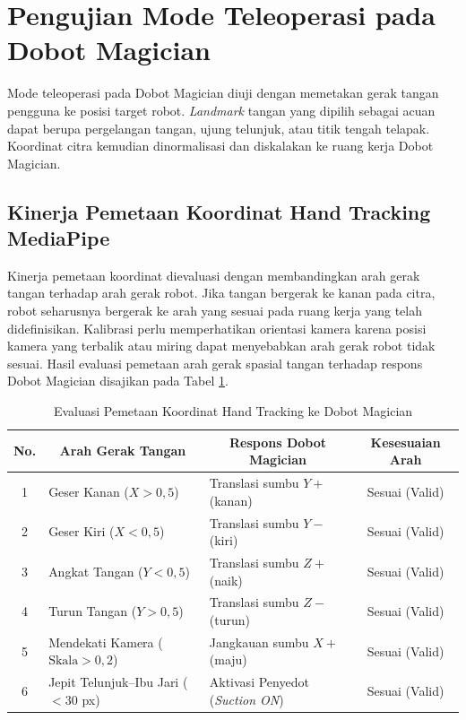 \section{Pengujian Mode Teleoperasi pada Dobot Magician}
Mode teleoperasi pada Dobot Magician diuji dengan memetakan gerak tangan pengguna ke posisi target robot. \textit{Landmark} tangan yang dipilih sebagai acuan dapat berupa pergelangan tangan, ujung telunjuk, atau titik tengah telapak. Koordinat citra kemudian dinormalisasi dan diskalakan ke ruang kerja Dobot Magician.

\subsection{Kinerja Pemetaan Koordinat Hand Tracking MediaPipe}
Kinerja pemetaan koordinat dievaluasi dengan membandingkan arah gerak tangan terhadap arah gerak robot. Jika tangan bergerak ke kanan pada citra, robot seharusnya bergerak ke arah yang sesuai pada ruang kerja yang telah didefinisikan. Kalibrasi perlu memperhatikan orientasi kamera karena posisi kamera yang terbalik atau miring dapat menyebabkan arah gerak robot tidak sesuai. Hasil evaluasi pemetaan arah gerak spasial tangan terhadap respons Dobot Magician disajikan pada Tabel \ref{tab:pemetaan_dobot}.

\begin{table}[htbp]
\centering
\caption{Evaluasi Pemetaan Koordinat Hand Tracking ke Dobot Magician}
\label{tab:pemetaan_dobot}
\begin{tabular}{|c|p{4.5cm}|p{5cm}|c|}
\hline
\textbf{No.} & \multicolumn{1}{c|}{\textbf{Arah Gerak Tangan}} & \multicolumn{1}{c|}{\textbf{Respons Dobot Magician}} & \textbf{Kesesuaian Arah} \\ \hline
1 & Geser Kanan ($X > 0{,}5$) & Translasi sumbu $Y+$ (kanan) & Sesuai (Valid) \\ \hline
2 & Geser Kiri ($X < 0{,}5$) & Translasi sumbu $Y-$ (kiri) & Sesuai (Valid) \\ \hline
3 & Angkat Tangan ($Y < 0{,}5$) & Translasi sumbu $Z+$ (naik) & Sesuai (Valid) \\ \hline
4 & Turun Tangan ($Y > 0{,}5$) & Translasi sumbu $Z-$ (turun) & Sesuai (Valid) \\ \hline
5 & Mendekati Kamera ($\text{Skala} > 0{,}2$) & Jangkauan sumbu $X+$ (maju) & Sesuai (Valid) \\ \hline
6 & Jepit Telunjuk--Ibu Jari ($< 30$ px) & Aktivasi Penyedot (\textit{Suction ON}) & Sesuai (Valid) \\ \hline
\end{tabular}
\end{table}

